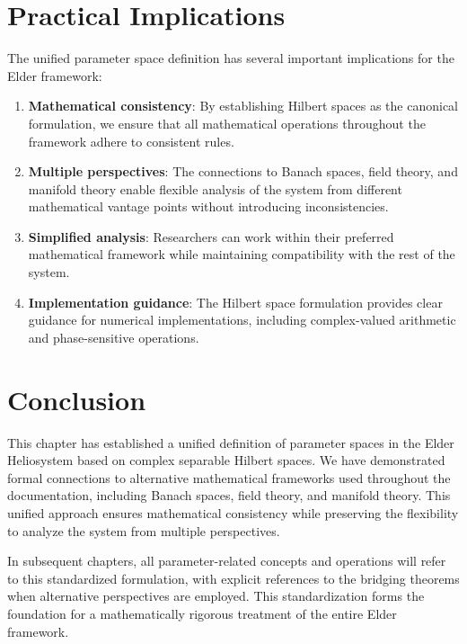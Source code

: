 \section{Practical Implications}

The unified parameter space definition has several important implications for the Elder framework:

\begin{enumerate}
    \item \textbf{Mathematical consistency}: By establishing Hilbert spaces as the canonical formulation, we ensure that all mathematical operations throughout the framework adhere to consistent rules.
    
    \item \textbf{Multiple perspectives}: The connections to Banach spaces, field theory, and manifold theory enable flexible analysis of the system from different mathematical vantage points without introducing inconsistencies.
    
    \item \textbf{Simplified analysis}: Researchers can work within their preferred mathematical framework while maintaining compatibility with the rest of the system.
    
    \item \textbf{Implementation guidance}: The Hilbert space formulation provides clear guidance for numerical implementations, including complex-valued arithmetic and phase-sensitive operations.
\end{enumerate}

\section{Conclusion}

This chapter has established a unified definition of parameter spaces in the Elder Heliosystem based on complex separable Hilbert spaces. We have demonstrated formal connections to alternative mathematical frameworks used throughout the documentation, including Banach spaces, field theory, and manifold theory. This unified approach ensures mathematical consistency while preserving the flexibility to analyze the system from multiple perspectives.

In subsequent chapters, all parameter-related concepts and operations will refer to this standardized formulation, with explicit references to the bridging theorems when alternative perspectives are employed. This standardization forms the foundation for a mathematically rigorous treatment of the entire Elder framework.